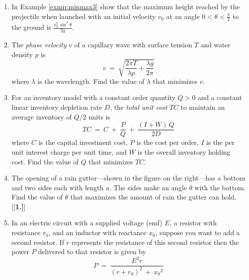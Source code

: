 {\begin{enumerate}[\bfseries 1.]
 \item\label{exer:projmaxangle} In Example \ref{exmp:minmax3} show that the
  maximum height reached by the projectile when launched with an initial
  velocity $v_0$ at an angle $0<\theta<\frac{\pi}{2}$ to the ground is
  $\frac{v_0^2\,\sin^2 \theta}{2g}$.
 \item The \emph{phase velocity} $v$ of a capillary wave with surface tension
  $T$ and water density $p$ is
\[
v ~=~ \sqrt{\frac{2\pi T}{\lambda p} + \frac{\lambda g}{2\pi}}
\]
where $\lambda$ is the wavelength. Find the value of $\lambda$ that minimizes
$v$.
 \item\label{exer:inventory} For an inventory model with a constant order
  quantity $Q>0$ and a constant linear inventory depletion rate $D$, the
  \emph{total unit cost} $TC$ to maintain an average inventory of $Q/2$ units is
\[
TC ~=~ C ~+~ \frac{P}{Q} ~+~ \frac{(I+W)\,Q}{2D}
\]
where $C$ is the capital investment cost, $P$ is the cost per order, $I$ is
the per unit interest charge per unit time, and $W$ is the overall inventory
holding cost. Find the value of $Q$ that minimizes $TC$.
 \item The opening of a rain gutter---shown in the figure on the right---has
a bottom and two sides each with length $a$. The sides make an angle $\theta$
with the bottom. Find the value of $\theta$ that maximizes the amount of rain
the gutter can hold.
[{[\bfseries 1.]}]
\item
  In an electric circuit with a supplied voltage (emf) $E$, a resistor
  with resistance $r_0$, and an inductor with reactance $x_0$, suppose you want
  to add a second resistor. If $r$ represents the resistance of this second
  resistor then the power $P$ delivered to that resistor is given by
 \begin{displaymath}
  P ~=~ \dfrac{E^2 r}{(r + r_0)^2 ~+~ {x_0}^2}

\end{displaymath}
\end{enumerate}}
